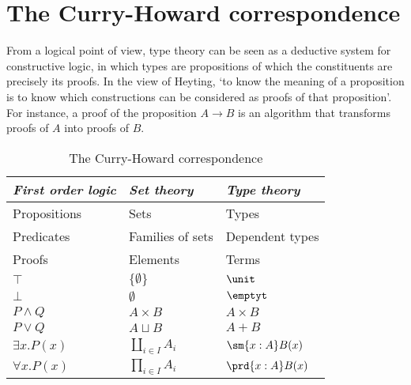 \section{The Curry-Howard correspondence}
From a logical point of view, type theory can be seen as a deductive system for constructive logic, in which types are propositions of which the constituents are precisely its proofs. In the view of Heyting, `to know the meaning of a proposition is to know which constructions can be considered as proofs of that proposition'. For instance, a proof of the proposition $A\to B$ is an algorithm that transforms proofs of $A$ into proofs of $B$.
\begin{table}
\caption{The Curry-Howard correspondence}
\begin{center}
\begin{tabular}{lll}
\toprule
\emph{First order logic} & \emph{Set theory} & \emph{Type theory}\\
\midrule
Propositions & Sets & Types\\
Predicates & Families of sets & Dependent types\\
Proofs & Elements & Terms \\
$\top$ & $\{\emptyset\}$ & $\unit$\\
$\bot$ & $\emptyset$ & $\emptyt$ \\
$P \land Q$ & $A \times B$ & $A \times B$ \\
$P \vee Q$ & $A \sqcup B$ & $A + B$ \\
$\exists x.P(x)$ & $\coprod_{i\in I}A_i$ & $\sm{x:A}B(x)$ \\
$\forall x.P(x)$ & $\prod_{i\in I}A_i$ & $\prd{x:A}B(x)$\\
\bottomrule
\end{tabular}
\end{center}
\end{table}
